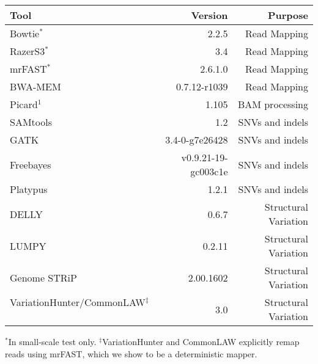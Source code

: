 \begin{table*}[htb]
\caption{Tools and their version numbers we used in this study.}
\begin{center}
\begin{tabular}{|l|r|r|}
\hline
{\bf Tool} & {\bf Version} & {\bf Purpose}\\
\hline
Bowtie$^*$~\citep{Langmead2009} & 2.2.5 & Read Mapping \\
RazerS3$^*$~\citep{Weese2012} & 3.4 & Read Mapping\\
mrFAST$^*$~\citep{Alkan2009} & 2.6.1.0 & Read Mapping \\
BWA-MEM~\citep{Li2013} & 0.7.12-r1039 & Read Mapping\\
Picard$^1$ & 1.105 & BAM processing\\
SAMtools~~\citep{Li2009b} & 1.2 & SNVs and indels\\
GATK~\citep{DePristo2011} & 3.4-0-g7e26428 & SNVs and indels\\
Freebayes~\citep{Garrison2012} & v0.9.21-19-gc003c1e & SNVs and indels\\
Platypus~\citep{Rimmer2014} & 1.2.1 & SNVs and indels\\
DELLY~\citep{Rausch2012} & 0.6.7 & Structural Variation\\
LUMPY~\citep{Layer2014} & 0.2.11 & Structural Variation\\
Genome STRiP~\citep{Handsaker2015} & 2.00.1602 & Structural Variation\\
VariationHunter/CommonLAW$^\ddag$~\citep{Hormozdiari2009,Hormozdiari2011b} & 3.0 & Structural Variation\\
\hline
\end{tabular}
\end{center}
{\footnotesize $^*$In small-scale test only. $^\ddag$VariationHunter and CommonLAW explicitly remap reads using mrFAST, which we show to be a deterministic mapper.}
\label{supptab:tools}
\end{table*}



